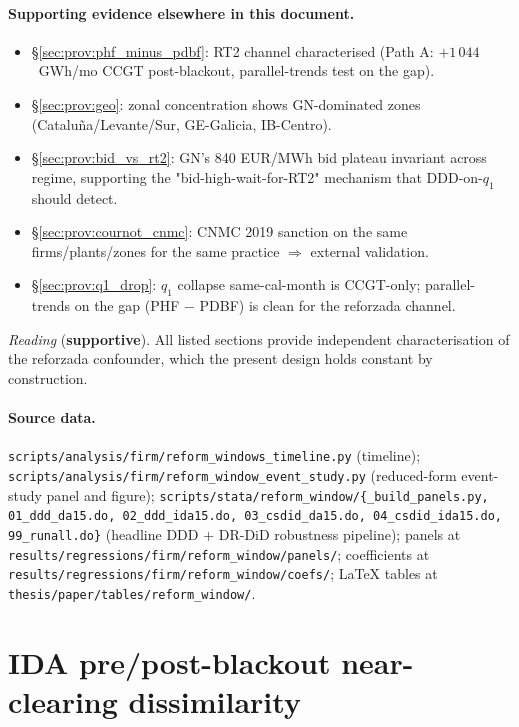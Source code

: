 \documentclass[11pt,a4paper]{article}
\newcommand{\code}[1]{\nolinkurl{#1}}
\begin{document}
\paragraph{Supporting evidence elsewhere in this document.}
\begin{itemize}
\item \S\ref{sec:prov:phf_minus_pdbf}: RT2 channel characterised (Path A: $+1\,044$~GWh/mo CCGT post-blackout, parallel-trends test on the gap).
\item \S\ref{sec:prov:geo}: zonal concentration shows GN-dominated zones (Cataluña/Levante/Sur, GE-Galicia, IB-Centro).
\item \S\ref{sec:prov:bid_vs_rt2}: GN's 840 EUR/MWh bid plateau invariant across regime, supporting the "bid-high-wait-for-RT2" mechanism that DDD-on-$q_1$ should detect.
\item \S\ref{sec:prov:cournot_cnmc}: CNMC 2019 sanction on the same firms/plants/zones for the same practice $\Rightarrow$ external validation.
\item \S\ref{sec:prov:q1_drop}: $q_1$ collapse same-cal-month is CCGT-only; parallel-trends on the gap (PHF $-$ PDBF) is clean for the reforzada channel.
\end{itemize}

\textit{Reading} (\textbf{supportive}). All listed sections provide independent characterisation of the reforzada confounder, which the present design holds constant by construction.

\paragraph{Source data.}
\code{scripts/analysis/firm/reform_windows_timeline.py} (timeline);
\code{scripts/analysis/firm/reform_window_event_study.py} (reduced-form event-study panel and figure);
\code{scripts/stata/reform_window/{_build_panels.py, 01_ddd_da15.do, 02_ddd_ida15.do, 03_csdid_da15.do, 04_csdid_ida15.do, 99_runall.do}} (headline DDD + DR-DiD robustness pipeline);
panels at \code{results/regressions/firm/reform_window/panels/}; coefficients at \code{results/regressions/firm/reform_window/coefs/}; LaTeX tables at \code{thesis/paper/tables/reform_window/}.


\section{IDA pre/post-blackout near-clearing dissimilarity}\label{sec:prov:ida_pre_post}
\end{document}
